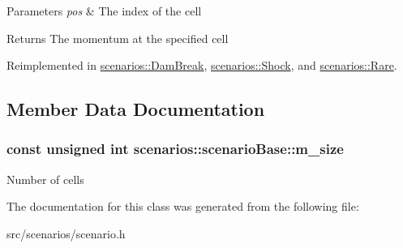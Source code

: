 \begin{DoxyParams}{Parameters}
{\em pos} & The index of the cell\\
\hline
\end{DoxyParams}
\begin{DoxyReturn}{Returns}
The momentum at the specified cell 
\end{DoxyReturn}


Reimplemented in \hyperlink{classscenarios_1_1DamBreak_a15d0ac494904dfb9059f0b8685e49e0f}{scenarios\-::\-Dam\-Break}, \hyperlink{classscenarios_1_1Shock_a89b88a5223ae0f82178ac63c724a6d91}{scenarios\-::\-Shock}, and \hyperlink{classscenarios_1_1Rare_a33b6c2b5a5d81d7e1a1f5b0c0028ac2d}{scenarios\-::\-Rare}.



\subsection{Member Data Documentation}
\hypertarget{classscenarios_1_1scenarioBase_a67c277c3749ab83d0cb1749200a38791}{
\subsubsection[{m\-\_\-size}]{\setlength{\rightskip}{0pt plus 5cm}const unsigned int scenarios\-::scenario\-Base\-::m\-\_\-size\hspace{0.3cm}{\ttfamily [protected]}}}\label{classscenarios_1_1scenarioBase_a67c277c3749ab83d0cb1749200a38791}
Number of cells 

The documentation for this class was generated from the following file\-:\begin{DoxyCompactItemize}
\item 
src/scenarios/scenario.\-h\end{DoxyCompactItemize}
